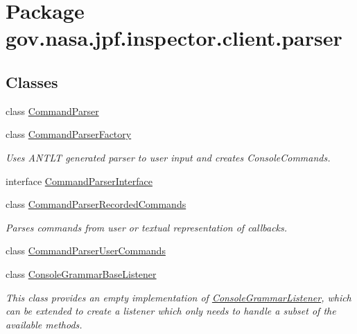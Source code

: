 \hypertarget{namespacegov_1_1nasa_1_1jpf_1_1inspector_1_1client_1_1parser}{}\section{Package gov.\+nasa.\+jpf.\+inspector.\+client.\+parser}
\label{namespacegov_1_1nasa_1_1jpf_1_1inspector_1_1client_1_1parser}
\subsection*{Classes}
\begin{DoxyCompactItemize}
\item 
class \hyperlink{classgov_1_1nasa_1_1jpf_1_1inspector_1_1client_1_1parser_1_1_command_parser}{Command\+Parser}
\item 
class \hyperlink{classgov_1_1nasa_1_1jpf_1_1inspector_1_1client_1_1parser_1_1_command_parser_factory}{Command\+Parser\+Factory}
\begin{DoxyCompactList}\small\item\em Uses A\+N\+T\+LT generated parser to user input and creates Console\+Commands. \end{DoxyCompactList}\item 
interface \hyperlink{interfacegov_1_1nasa_1_1jpf_1_1inspector_1_1client_1_1parser_1_1_command_parser_interface}{Command\+Parser\+Interface}
\item 
class \hyperlink{classgov_1_1nasa_1_1jpf_1_1inspector_1_1client_1_1parser_1_1_command_parser_recorded_commands}{Command\+Parser\+Recorded\+Commands}
\begin{DoxyCompactList}\small\item\em Parses commands from user or textual representation of callbacks. \end{DoxyCompactList}\item 
class \hyperlink{classgov_1_1nasa_1_1jpf_1_1inspector_1_1client_1_1parser_1_1_command_parser_user_commands}{Command\+Parser\+User\+Commands}
\item 
class \hyperlink{classgov_1_1nasa_1_1jpf_1_1inspector_1_1client_1_1parser_1_1_console_grammar_base_listener}{Console\+Grammar\+Base\+Listener}
\begin{DoxyCompactList}\small\item\em This class provides an empty implementation of \hyperlink{interfacegov_1_1nasa_1_1jpf_1_1inspector_1_1client_1_1parser_1_1_console_grammar_listener}{Console\+Grammar\+Listener}, which can be extended to create a listener which only needs to handle a subset of the available methods. \end{DoxyCompactList}\item 

\end{DoxyCompactItemize}
